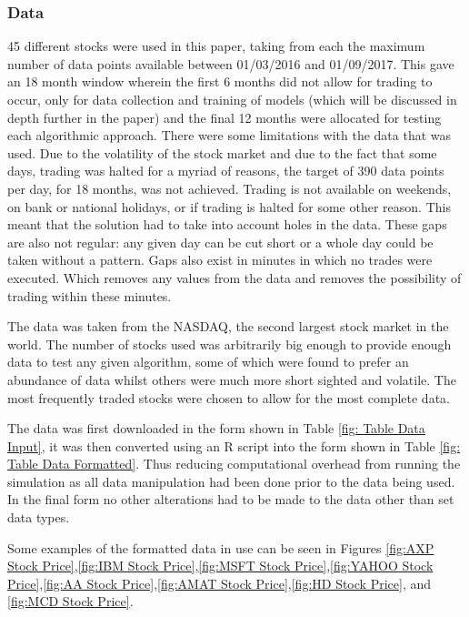 \documentclass[conference]{IEEEtran}
\begin{document}
\subsubsection{Data}

45 different stocks were used in this paper, taking from each the maximum number of data points available between 01/03/2016 and 01/09/2017. This gave an 18 month window wherein the first 6 months did not allow for trading to occur, only for data collection and training of models (which will be discussed in depth further in the paper) and the final 12 months were allocated for testing each algorithmic approach. There were some limitations with the data that was used. Due to the volatility of the stock market and due to the fact that some days, trading was halted for a myriad of reasons, the target of 390 data points per day, for 18 months, was not achieved. Trading is not available on weekends, on bank or national holidays, or if trading is halted for some other reason. This meant that the solution had to take into account holes in the data. These gaps are also not regular: any given day can be cut short or a whole day could be taken without a pattern. Gaps also exist in minutes in  which no trades were executed. Which removes any values from the data and removes the possibility of trading within these minutes.

The data was taken from the NASDAQ, the second largest stock market in the world. The number of stocks used was arbitrarily big enough to provide enough data to test any given algorithm, some of which were found to prefer an abundance of data whilst others were much more short sighted and volatile. The most frequently traded stocks were chosen to allow for the most complete data.

The data was first downloaded in the form shown in Table \ref{fig: Table Data Input}, it was then converted using an R script into the form shown in Table \ref{fig: Table Data Formatted}. Thus reducing computational overhead from running the simulation as all data manipulation had been done prior to the data being used. In the final form no other alterations had to be made to the data other than set data types. 

Some examples of the formatted data in use can be seen in Figures  \ref{fig:AXP Stock Price},\ref{fig:IBM Stock Price},\ref{fig:MSFT Stock Price},\ref{fig:YAHOO Stock Price},\ref{fig:AA Stock Price},\ref{fig:AMAT Stock Price},\ref{fig:HD Stock Price}, and \ref{fig:MCD Stock Price}.
\end{document}
